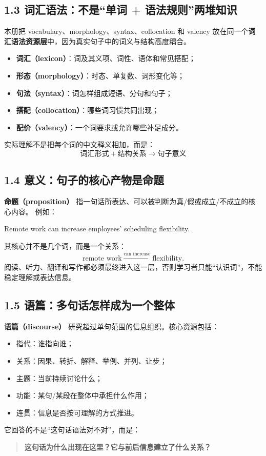 \documentclass[11pt,a4paper]{ctexart}
\newcommand{\kw}[1]{\textbf{#1}}
\newcommand{\term}[2]{\textbf{#1（#2）}}
\begin{document}
\subsection{1.3 词汇语法：不是“单词 + 语法规则”两堆知识}
本册把 vocabulary、morphology、syntax、collocation 和 valency 放在同一个\kw{词汇语法资源层}中，因为真实句子中的词义与结构高度耦合。
\begin{itemize}
  \item \term{词汇}{lexicon}：词及其义项、词性、语体和常见搭配；
  \item \term{形态}{morphology}：时态、单复数、词形变化等；
  \item \term{句法}{syntax}：词怎样组成短语、分句和句子；
  \item \term{搭配}{collocation}：哪些词习惯共同出现；
  \item \term{配价}{valency}：一个词要求或允许哪些补足成分。
\end{itemize}
实际理解不是把每个词的中文释义相加，而是：
\[
\boxed{
\text{词汇形式}
+\text{结构关系}
\rightarrow
\text{句子意义}
}
\]

\subsection{1.4 意义：句子的核心产物是命题}
\term{命题}{proposition} 指一句话所表达、可以被判断为真/假或成立/不成立的核心内容。
例如：
\begin{eng}
Remote work can increase employees' scheduling flexibility.
\end{eng}
其核心并不是几个词，而是一个关系：
\[
\text{remote work}
\xrightarrow{\text{can increase}}
\text{flexibility}.
\]
阅读、听力、翻译和写作都必须最终进入这一层，否则学习者只能“认识词”，不能稳定理解或表达信息。

\subsection{1.5 语篇：多句话怎样成为一个整体}
\term{语篇}{discourse} 研究超过单句范围的信息组织。核心资源包括：
\begin{itemize}
  \item 指代：谁指向谁；
  \item 关系：因果、转折、解释、举例、并列、让步；
  \item 主题：当前持续讨论什么；
  \item 功能：某句/某段在整体中承担什么作用；
  \item 连贯：信息是否按可理解的方式推进。
\end{itemize}
它回答的不是“这句话语法对不对”，而是：
\begin{quote}
\kw{这句话为什么出现在这里？它与前后信息建立了什么关系？}
\end{quote}
\end{document}
